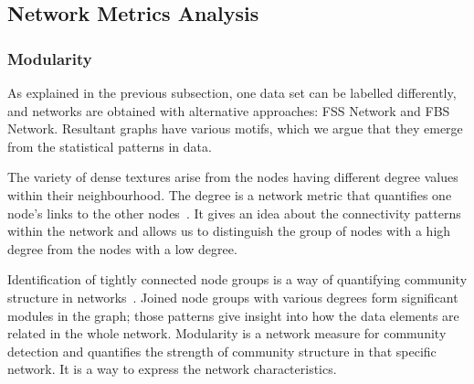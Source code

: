 \subsection*{Network Metrics Analysis}
%
\subsubsection*{Modularity}
As explained in the previous subsection, one data set can be labelled differently, and networks are obtained with alternative approaches: FSS Network and FBS Network. Resultant graphs have various motifs, which we argue that they emerge from the statistical patterns in data.

The variety of dense textures arise from the nodes having different degree values within their neighbourhood. The degree is a network metric that quantifies one node's links to the other nodes~\cite{Barabasi2016}. It gives an idea about the connectivity patterns within the network and allows us to distinguish the group of nodes with a high degree from the nodes with a low degree.

Identification of tightly connected node groups is a way of quantifying community structure in networks~\cite{Girvan7821}. Joined node groups with various degrees form significant modules in the graph; those patterns give insight into how the data elements are related in the whole network. Modularity is a network measure for community detection and quantifies the strength of community structure in that specific network. It is a way to express the network characteristics.

